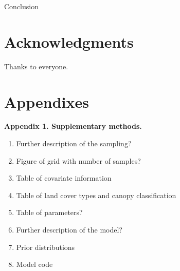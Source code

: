 \documentclass[preprint,review,times,12pt]{elsarticle}
\begin{document}
Conclusion



\section{Acknowledgments}
Thanks to everyone.


\newpage
\section{Appendixes}
\textbf{Appendix 1. Supplementary methods.}
\begin{enumerate}
    \item Further description of the sampling?
    \item Figure of grid with number of samples?
    \item Table of covariate information
    \item Table of land cover types and canopy classification
    \item Table of parameters?
    \item Further description of the model?
    \item Prior distributions
    \item Model code
\end{enumerate}
\end{document}
